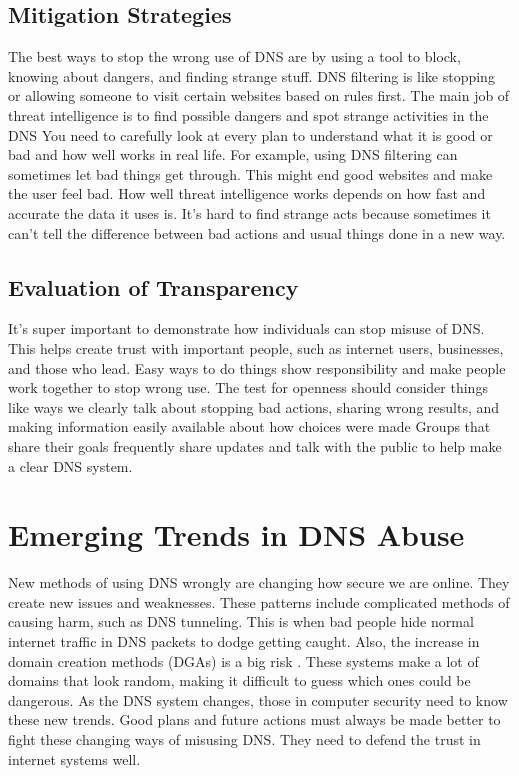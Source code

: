 \subsection{Mitigation Strategies}

The best ways to stop the wrong use of DNS are by using a tool to block, knowing about dangers, and finding strange stuff. DNS filtering is like stopping or allowing someone to visit certain websites based on rules first. The main job of threat intelligence is to find possible dangers and spot strange activities in the DNS \cite{rizvi2022application} You need to carefully look at every plan to understand what it is good or bad and how well works in real life. For example, using DNS filtering can sometimes let bad things get through. This might end good websites and make the user feel bad. How well threat intelligence works depends on how fast and accurate the data it uses is. It's hard to find strange acts because sometimes it can't tell the difference between bad actions and usual things done in a new way.

\subsection{Evaluation of Transparency}

It's super important to demonstrate how individuals can stop misuse of DNS. This helps create trust with important people, such as internet users, businesses, and those who lead. Easy ways to do things show responsibility and make people work together to stop wrong use. The test for openness should consider things like ways we clearly talk about stopping bad actions, sharing wrong results, and making information easily available about how choices were made \cite{chaganti2023survey} Groups that share their goals frequently share updates and talk with the public to help make a clear DNS system.

\section{Emerging Trends in DNS Abuse}

New methods of using DNS wrongly are changing how secure we are online. They create new issues and weaknesses. These patterns include complicated methods of causing harm, such as DNS tunneling. This is when bad people hide normal internet traffic in DNS packets to dodge getting caught. Also, the increase in domain creation methods (DGAs) is a big risk \cite{kapoor2021ransomware}. These systems make a lot of domains that look random, making it difficult to guess which ones could be dangerous. As the DNS system changes, those in computer security need to know these new trends. Good plans and future actions must always be made better to fight these changing ways of misusing DNS. They need to defend the trust in internet systems well.

